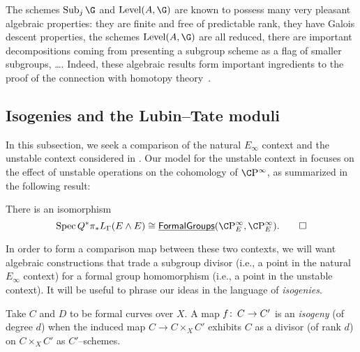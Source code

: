 \begin{remark}
The schemes $\Sub_j \G$ and $\Level(A, \G)$ are known to possess many very pleasant algebraic properties: they are finite and free of predictable rank, they have Galois descent properties, the schemes $\Level(A, \G)$ are all reduced, there are important decompositions coming from presenting a subgroup scheme as a flag of smaller subgroups, \ldots.  Indeed, these algebraic results form important ingredients to the proof of the connection with homotopy theory~\cite[Section 9]{StricklandEthyOfBSigma}.
\end{remark}










\subsection*{Isogenies and the Lubin--Tate moduli}

In this subsection, we seek a comparison of the natural $E_\infty$ context and the unstable context considered in .  Our model for the unstable context in  focuses on the effect of unstable operations on the cohomology of $\CP^\infty$, as summarized in the following result:

\begin{lemma}
There is an isomorphism \[\Spec Q^* \pi_* L_\Gamma(E \sm E) \cong \InternalHom{FormalGroups}(\CP^\infty_E, \CP^\infty_E). \qed\]
\end{lemma}

\noindent In order to form a comparison map between these two contexts, we will want algebraic constructions that trade a subgroup divisor (i.e., a point in the natural $E_\infty$ context) for a formal group homomorphism (i.e., a point in the unstable context).  It will be useful to phrase our ideas in the language of \emph{isogenies}.

\begin{definition}
Take $C$ and $D$ to be formal curves over $X$.  A map $f\colon\thinspace C \to C'$ is an \textit{isogeny} (of degree $d$) when the induced map $C \to C \times_X C'$ exhibits $C$ as a divisor (of rank $d$) on $C \times_X C'$ as $C'$--schemes.
\end{definition}

